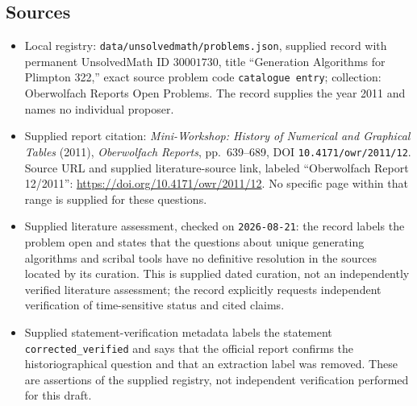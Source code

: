 \documentclass[11pt]{article}
\begin{document}
\subsection{Sources}
\begin{itemize}
\item Local registry: \texttt{data/unsolvedmath/problems.json}, supplied record with permanent UnsolvedMath ID \(30001730\), title ``Generation Algorithms for Plimpton 322,'' exact source problem code \texttt{catalogue entry}; collection: Oberwolfach Reports Open Problems. The record supplies the year 2011 and names no individual proposer.
\item Supplied report citation: \emph{Mini-Workshop: History of Numerical and Graphical Tables} (2011), \emph{Oberwolfach Reports}, pp.~639--689, DOI \texttt{10.4171/owr/2011/12}. Source URL and supplied literature-source link, labeled ``Oberwolfach Report 12/2011'': \url{https://doi.org/10.4171/owr/2011/12}. No specific page within that range is supplied for these questions.
\item Supplied literature assessment, checked on \texttt{2026-08-21}: the record labels the problem open and states that the questions about unique generating algorithms and scribal tools have no definitive resolution in the sources located by its curation. This is supplied dated curation, not an independently verified literature assessment; the record explicitly requests independent verification of time-sensitive status and cited claims.
\item Supplied statement-verification metadata labels the statement \texttt{corrected\_verified} and says that the official report confirms the historiographical question and that an extraction label was removed. These are assertions of the supplied registry, not independent verification performed for this draft.
\end{itemize}
\end{document}
